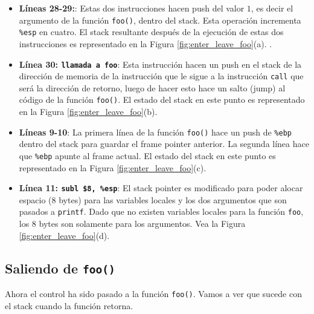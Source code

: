 \begin{itemize}
\item \textbf{Líneas 28-29:}:
Estas dos instrucciones hacen push del valor $1$, es decir el argumento de la función {\tt foo()}, dentro del stack. Esta operación incrementa {\tt \%esp} en cuatro. El stack resultante después de la ejecución de estas dos instrucciones es representado en la Figura \ref{fig:enter_leave_foo}(a).
.

\item \textbf{Línea 30: \texttt{llamada a foo}}: 
Esta instrucción hacen un push en el stack de la dirección de memoria de la instrucción que le sigue a la instrucción {\tt call} que será la dirección de retorno, luego de hacer esto hace un salto (jump) al código de la función {\tt foo()}. 
El estado del stack en este punto es representado en la Figura  \ref{fig:enter_leave_foo}(b).

\item \textbf{Líneas 9-10}:
La primera línea de la función {\tt foo()} hace un push de {\tt \%ebp} dentro del stack para guardar el frame pointer anterior. La segunda línea hace que {\tt \%ebp} apunte al frame actual. El estado del stack en este punto es representado en la Figura \ref{fig:enter_leave_foo}(c).

\item \textbf{Línea 11: \texttt{subl \$8, \%esp}}:
El stack pointer es modificado para poder alocar espacio (8 bytes) para las variables locales y los dos argumentos que son pasados a {\tt printf}. Dado que no existen variables locales para la función {\tt foo}, los 8 bytes son solamente para los argumentos. Vea la Figura \ref{fig:enter_leave_foo}(d). 

\end{itemize}


\subsection{Saliendo de {\tt foo()}}

Ahora el control ha sido pasado a la función {\tt foo()}. Vamos a ver que sucede con el stack cuando la función retorna.

